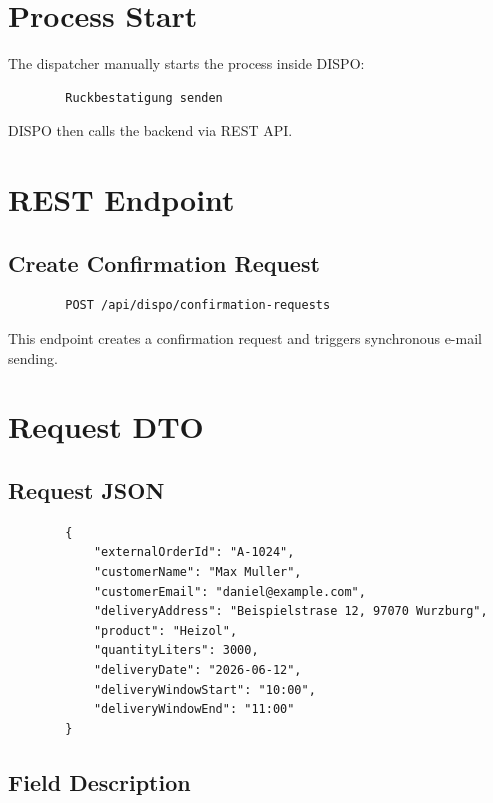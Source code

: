 \documentclass[a4paper,11pt]{article}
\begin{document}
	\section{Process Start}
	
	The dispatcher manually starts the process inside DISPO:
	
	\begin{lstlisting}
		Ruckbestatigung senden
	\end{lstlisting}
	
	DISPO then calls the backend via REST API.
	
	\section{REST Endpoint}
	
	\subsection{Create Confirmation Request}
	
	\begin{lstlisting}
		POST /api/dispo/confirmation-requests
	\end{lstlisting}
	
	This endpoint creates a confirmation request and triggers synchronous e-mail sending.
	
	\section{Request DTO}
	
	\subsection{Request JSON}
	
	\begin{lstlisting}
		{
			"externalOrderId": "A-1024",
			"customerName": "Max Muller",
			"customerEmail": "daniel@example.com",
			"deliveryAddress": "Beispielstrase 12, 97070 Wurzburg",
			"product": "Heizol",
			"quantityLiters": 3000,
			"deliveryDate": "2026-06-12",
			"deliveryWindowStart": "10:00",
			"deliveryWindowEnd": "11:00"
		}
	\end{lstlisting}
	
	\subsection{Field Description}
	
\end{document}
